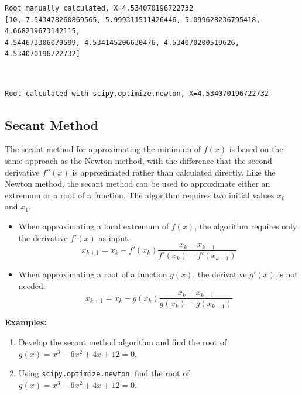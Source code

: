 \documentclass[11pt]{article}
\providecommand{\tightlist}{%
      \setlength{\itemsep}{0pt}\setlength{\parskip}{0pt}}
\begin{document}
    \begin{Verbatim}[commandchars=\\\{\}]
Root manually calculated, X=4.534070196722732
[10, 7.543478260869565, 5.999311511426446, 5.099628236795418, 4.668219673142115,
4.544673306079599, 4.534145206630476, 4.534070200519626, 4.534070196722732]
    \end{Verbatim}

    \begin{center}
    \end{center}
    { \hspace*{\fill} \\}
    
    \begin{Verbatim}[commandchars=\\\{\}]
Root calculated with scipy.optimize.newton, X=4.534070196722732
    \end{Verbatim}

    \subsection{Secant Method}\label{secant-method}

The secant method for approximating the minimum of \(f(x)\) is based on
the same approach as the Newton method, with the difference that the
second derivative \(f''(x)\) is approximated rather than calculated
directly. Like the Newton method, the secant method can be used to
approximate either an extremum or a root of a function. The algorithm
requires two initial values \(x_0\) and \(x_1\).

\begin{itemize}
\tightlist
\item
  When approximating a local extremum of \(f(x)\), the algorithm
  requires only the derivative \(f'(x)\) as input. \[
  x_{k+1} = x_k - f'(x_k) \frac{x_k - x_{k-1}}{f'(x_k) - f'(x_{k-1})}
  \]
\item
  When approximating a root of a function \(g(x)\), the derivative
  \(g'(x)\) is not needed. \[
  x_{k+1} = x_k - g(x_k) \frac{x_k - x_{k-1}}{g(x_k) - g(x_{k-1})}
  \]
\end{itemize}

\textbf{Examples:}

\begin{enumerate}
\def\labelenumi{\arabic{enumi}.}
\item
  Develop the secant method algorithm and find the root of
  \(g(x) = x^3 - 6x^2 + 4x + 12 = 0\).
\item
  Using \texttt{scipy.optimize.newton}, find the root of
  \(g(x) = x^3 - 6x^2 + 4x + 12 = 0\).
\end{enumerate}
\end{document}
